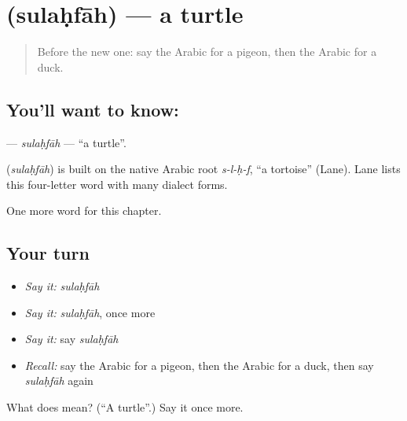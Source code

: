\section[\texorpdfstring{\ar{سلحفاة} (sulaḥfāh)}{سلحفاة (sulaḥfāh)}]{ (sulaḥfāh) — a turtle}

\label{lesson:AR-C135-sulahfah}



\begin{quote}
Before the new one: say the Arabic for a pigeon, then the Arabic for a duck.
\end{quote}

\subsection*{You'll want to know: }
\textbf{} — \emph{sulaḥfāh} — \textquotedblleft{}a turtle\textquotedblright{}.

\begin{cousinweb}
\textbf{} (\emph{sulaḥfāh}) is built on the native Arabic root \emph{s-l-ḥ-f}, \textquotedblleft{}a tortoise\textquotedblright{} (Lane). Lane lists this four-letter word with many dialect forms.
\end{cousinweb}

\begin{grammarlens}[title={What you've built}]
One more word for this chapter.
\end{grammarlens}

\subsection*{Your turn}
\begin{itemize}
\raggedright
  \item \emph{Say it:} \emph{sulaḥfāh}
  \item \emph{Say it:} \emph{sulaḥfāh}, once more
  \item \emph{Say it:} say \emph{sulaḥfāh}
  \item \emph{Recall:} say the Arabic for a pigeon, then the Arabic for a duck, then say \emph{sulaḥfāh} again
\end{itemize}

\begin{tcolorbox}[breakable,colback=teal!4,colframe=teal!35!black,title={Before you move on}]
What does  mean? (\textquotedblleft{}A turtle\textquotedblright{}.) Say it once more.
\end{tcolorbox}
